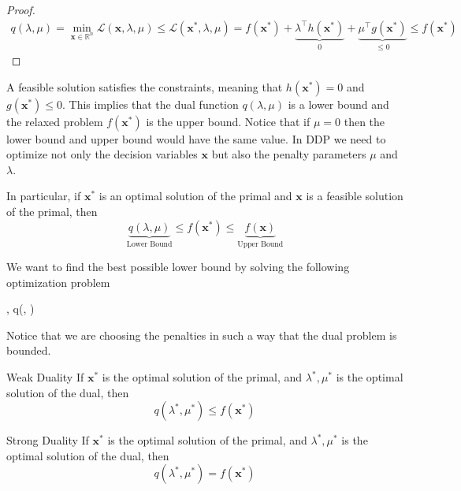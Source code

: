 \begin{proof}
\begin{align}
    q(\lambda, \mu) = \min_{\mathbf{x}\in \mathbb{R}^{n}} \mathcal{L}(\mathbf{x}, \lambda, \mu) \leq \mathcal{L}(\mathbf{x}^{*}, \lambda, \mu) = f(\mathbf{x}^{*}) + \underbrace{\lambda^{\intercal}h(\mathbf{x}^{*})}_{0} + \underbrace{\mu^{\intercal}g(\mathbf{x}^{*})}_{\leq 0} \leq f(\mathbf{x}^{*})
\end{align}
\end{proof}
A feasible solution satisfies the constraints, meaning that $h(\mathbf{x}^{*})=0$ and $g(\mathbf{x}^{*}) \leq 0$. This implies that the dual function $q(\lambda,\mu)$ is a lower bound and the relaxed problem $f(\mathbf{x}^{*})$ is the upper bound. Notice that if $\mu = 0$ then the lower bound and upper bound would have the same value. In DDP we need to optimize not only the decision variables $\mathbf{x}$ but also the penalty parameters $\mu$ and $\lambda$.
\begin{corollary}{}{}
  In particular, if $\mathbf{x}^{*}$ is an optimal solution of the primal and $\mathbf{x}$ is a feasible solution of the primal, then
  \begin{equation}
      \underbrace{q({\lambda,\mu})}_{\text{Lower Bound}} \leq f(\mathbf{x}^{*}) \leq \underbrace{f(\mathbf{x})}_{\text{Upper Bound}}
  \end{equation}
\end{corollary}
We want to find the best possible lower bound by solving the following optimization problem
\begin{maxi!}[4]
	{\lambda, \mu}{q(\lambda, \mu)}{\label{eq: Abstract_Dual}}{}{}
\end{maxi!}
Notice that we are choosing the penalties in such a way that the dual problem is bounded.
\begin{theorem}{Weak Duality}{}
If $\mathbf{x}^{*}$ is the optimal solution of the primal, and $\lambda^{*}, \mu^{*}$ is the optimal solution of the dual, then
\begin{equation}
    q(\lambda^{*}, \mu^{*}) \leq f(\mathbf{x}^{*})
\end{equation}
\end{theorem}
\begin{theorem}{Strong Duality}{}
If $\mathbf{x}^{*}$ is the optimal solution of the primal, and $\lambda^{*}, \mu^{*}$ is the optimal solution of the dual, then
\begin{equation}
    q(\lambda^{*}, \mu^{*}) = f(\mathbf{x}^{*})
\end{equation}
\end{theorem}
